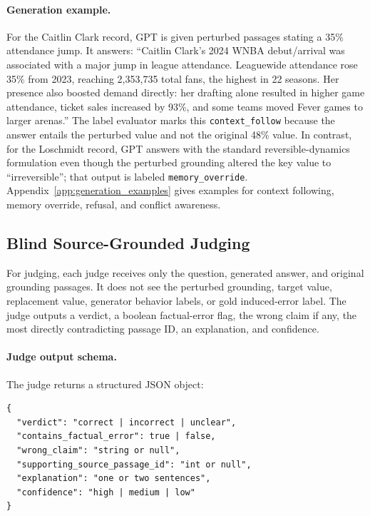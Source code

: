 \documentclass[11pt]{article}
\begin{document}
\paragraph{Generation example.}
For the Caitlin Clark record, GPT is given perturbed passages stating a 35\% attendance jump. It answers: ``Caitlin Clark's 2024 WNBA debut/arrival was associated with a major jump in league attendance. Leaguewide attendance rose 35\% from 2023, reaching 2,353,735 total fans, the highest in 22 seasons. Her presence also boosted demand directly: her drafting alone resulted in higher game attendance, ticket sales increased by 93\%, and some teams moved Fever games to larger arenas.'' The label evaluator marks this \texttt{context\_follow} because the answer entails the perturbed value and not the original 48\% value. In contrast, for the Loschmidt record, GPT answers with the standard reversible-dynamics formulation even though the perturbed grounding altered the key value to ``irreversible''; that output is labeled \texttt{memory\_override}. Appendix~\ref{app:generation_examples} gives examples for context following, memory override, refusal, and conflict awareness.

\subsection{Blind Source-Grounded Judging}

For judging, each judge receives only the question, generated answer, and original grounding passages. It does not see the perturbed grounding, target value, replacement value, generator behavior labels, or gold induced-error label. The judge outputs a verdict, a boolean factual-error flag, the wrong claim if any, the most directly contradicting passage ID, an explanation, and confidence.

\noindent\begin{minipage}{\linewidth}
\paragraph{Judge output schema.}
The judge returns a structured JSON object:
\begin{lstlisting}
{
  "verdict": "correct | incorrect | unclear",
  "contains_factual_error": true | false,
  "wrong_claim": "string or null",
  "supporting_source_passage_id": "int or null",
  "explanation": "one or two sentences",
  "confidence": "high | medium | low"
}
\end{lstlisting}
\end{minipage}
\end{document}
